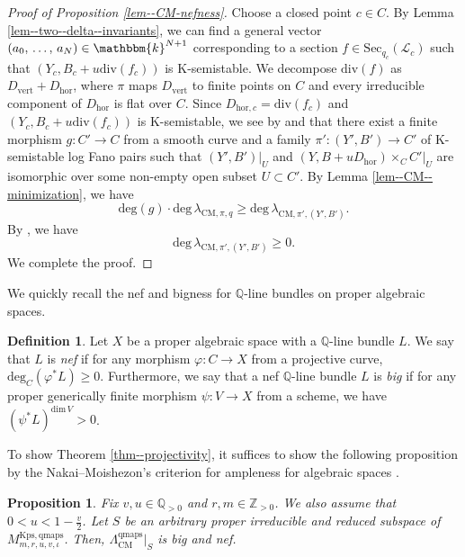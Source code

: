 \documentclass[12pt,twoside]{amsart}
\newtheorem{prop}[thm]{Proposition}
\theoremstyle{definition}
\newtheorem{defn}[thm]{Definition}
\begin{document}
\begin{proof}[Proof of Proposition \ref{lem--CM-nefness}]
    Choose a closed point $c\in C$. 
By Lemma \ref{lem--two--delta--invariants}, we can find a general vector $(a_{0},\,\dots,\,a_{N})\in\mathbbm{k}^{N+1}$ corresponding to a section $f\in \mathrm{Sec}_{q_c}(\mathscr{L}_c)$ such that $(Y_c,B_c+u\mathrm{div}(f_c))$ is K-semistable.
    We decompose $\mathrm{div}(f)$ as $D_{\mathrm{vert}}+D_{\mathrm{hor}}$, where $\pi$ maps $D_{\mathrm{vert}}$ to finite points on $C$ and every irreducible component of $D_{\mathrm{hor}}$ is flat over $C$.
    Since $D_{\mathrm{hor},c}=\mathrm{div}(f_c)$ and $(Y_c,B_c+u\mathrm{div}(f_c))$ is K-semistable, we see by \cite[Corollary 1.2]{BLX} and \cite[Corollary 7.4]{BHLLX} that there exist a finite morphism $g\colon C'\to C$ from a smooth curve and a family $\pi'\colon(Y',B')\to C'$ of K-semistable log Fano pairs such that $(Y',B')|_U$ and $(Y,B+uD_{\mathrm{hor}})\times_CC'|_U$ are isomorphic over some non-empty open subset $U\subset C'$.
    By Lemma \ref{lem--CM--minimization}, we have
    \[
   \mathrm{deg}(g)\cdot \mathrm{deg}\,\lambda_{\mathrm{CM},\pi,q}\ge\mathrm{deg}\,\lambda_{\mathrm{CM},\pi',(Y',B')}.
    \]
    By \cite[Corollary 4.7]{XZ1}, we have
    \[
    \mathrm{deg}\,\lambda_{\mathrm{CM},\pi',(Y',B')}\ge0.
    \]
    We complete the proof.
\end{proof}

We quickly recall the nef and bigness for $\mathbb{Q}$-line bundles on proper algebraic spaces. 
\begin{defn}
    Let $X$ be a proper algebraic space with a $\mathbb{Q}$-line bundle $L$.
    We say that $L$ is {\it nef} if for any morphism $\varphi\colon C\to X$ from a projective curve, $\mathrm{deg}_C(\varphi^*L)\ge0$.
    Furthermore, we say that a nef $\mathbb{Q}$-line bundle $L$ is {\it big} if for any proper generically finite morphism $\psi\colon V\to X$ from a scheme, we have $(\psi^*L)^{\mathrm{dim}\,V}>0$.
\end{defn}

To show Theorem \ref{thm--projectivity}, it suffices to show the following proposition by the Nakai--Moishezon's criterion for ampleness for algebraic spaces \cite[Theorem 3.11]{kollar-moduli-stable-surface-proj}.

\begin{prop}\label{prop--key--to--positivity}
Fix $v,u\in\mathbb{Q}_{>0}$ and $r,m\in\mathbb{Z}_{>0}$. 
We also assume that $0<u<1-\frac{v}{2}$. 
    Let $S$ be an arbitrary proper irreducible and reduced subspace of $M^{\mathrm{Kps,qmaps}}_{m,r,u,v,\iota}$. Then, $\Lambda^{\mathrm{qmaps}}_{\mathrm{CM}}|_S$ is big and nef.
\end{prop}
\end{document}
